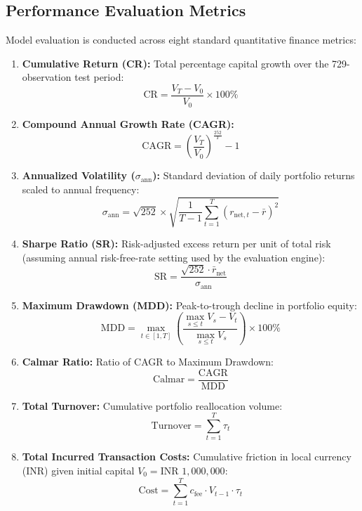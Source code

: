 \documentclass[conference]{IEEEtran}
\begin{document}
\subsection{Performance Evaluation Metrics}
Model evaluation is conducted across eight standard quantitative finance metrics:
\begin{enumerate}
    \item \textbf{Cumulative Return (CR):} Total percentage capital growth over the 729-observation test period:
    \begin{equation}
        \text{CR} = \frac{V_T - V_0}{V_0} \times 100\%
    \end{equation}
    \item \textbf{Compound Annual Growth Rate (CAGR):}
    \begin{equation}
        \text{CAGR} = \left(\frac{V_T}{V_0}\right)^{\frac{252}{T}} - 1
    \end{equation}
    \item \textbf{Annualized Volatility ($\sigma_{\text{ann}}$):} Standard deviation of daily portfolio returns scaled to annual frequency:
    \begin{equation}
        \sigma_{\text{ann}} = \sqrt{252} \times \sqrt{\frac{1}{T-1} \sum_{t=1}^T (r_{\text{net}, t} - \bar{r})^2}
    \end{equation}
    \item \textbf{Sharpe Ratio (SR):} Risk-adjusted excess return per unit of total risk (assuming annual risk-free-rate setting used by the evaluation engine):
    \begin{equation}
        \text{SR} = \frac{\sqrt{252} \cdot \bar{r}_{\text{net}}}{\sigma_{\text{ann}}}
    \end{equation}
    \item \textbf{Maximum Drawdown (MDD):} Peak-to-trough decline in portfolio equity:
    \begin{equation}
        \text{MDD} = \max_{t \in [1, T]} \left( \frac{\max_{s \le t} V_s - V_t}{\max_{s \le t} V_s} \right) \times 100\%
    \end{equation}
    \item \textbf{Calmar Ratio:} Ratio of CAGR to Maximum Drawdown:
    \begin{equation}
        \text{Calmar} = \frac{\text{CAGR}}{\text{MDD}}
    \end{equation}
    \item \textbf{Total Turnover:} Cumulative portfolio reallocation volume:
    \begin{equation}
        \text{Turnover} = \sum_{t=1}^T \tau_t
    \end{equation}
    \item \textbf{Total Incurred Transaction Costs:} Cumulative friction in local currency (INR) given initial capital $V_0 = \text{INR } 1,000,000$:
    \begin{equation}
        \text{Cost} = \sum_{t=1}^T c_{\text{fee}} \cdot V_{t-1} \cdot \tau_t
    \end{equation}
\end{enumerate}
\end{document}
